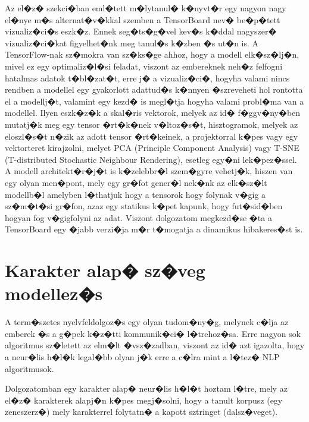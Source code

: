\documentclass[12pt]{report}
\theoremstyle{definition}
\begin{document}
Az el�z� szekci�ban eml�tett m�lytanul� k�nyvt�r egy nagyon nagy el�nye m�s 
alternat�v�kkal szemben a TensorBoard nev� be�p�tett vizualiz�ci�s eszk�z. 
Ennek seg�ts�g�vel kev�s k�ddal nagyszer� vizualiz�ci�kat figyelhet�nk meg 
tanul�s k�zben �s ut�n is. 
A TensorFlow-nak sz�mokra van sz�ks�ge ahhoz, hogy a modell elk�sz�lj�n, mivel 
ez egy optimaliz�l�si feladat, viszont az embereknek neh�z felfogni hatalmas 
adatok t�bl�zat�t, erre j� a vizualiz�ci�, hogyha valami nincs rendben a 
modellel egy gyakorlott adattud�s k�nnyen �szreveheti hol rontotta el a 
modellj�t, valamint egy kezd� is megl�tja hogyha valami probl�ma van a 
modellel. Ilyen eszk�z�k a skal�ris vektorok, melyek az id� f�ggv�ny�ben 
mutatj�k meg egy tensor �rt�k�nek v�ltoz�s�t, hisztogramok, melyek az 
eloszl�s�t n�zik az adott tensor �rt�keinek, a projektorral k�pes vagy egy 
vektorteret kirajzolni, melyet PCA (Principle Component Analysis) vagy T-SNE 
(T-distributed Stochastic Neighbour Rendering), esetleg egy�ni lek�pez�ssel. A 
modell architekt�r�j�t is k�zelebbr�l szem�gyre vehetj�k, hiszen van egy olyan 
men�pont, mely egy gr�fot gener�l nek�nk az elk�sz�lt modellb�l amelyben 
l�thatjuk hogy a tensorok hogy folynak v�gig a sz�m�t�si gr�fon, azaz egy 
statikus k�pet kapunk, hogy fut�sid�ben hogyan fog v�gigfolyni az adat. Viszont 
dolgozatom megkezd�se �ta a TensorBoard egy �jabb verzi�ja m�r t�mogatja a 
dinamikus hibakeres�st is.

\chapter{Karakter alap� sz�veg modellez�s}

A term�szetes nyelvfeldolgoz�s egy olyan tudom�ny�g, melynek c�lja az emberek �s a g�pek k�z�tti kommunik�ci� l�trehoz�sa. Erre nagyon sok algoritmus sz�letett az elm�lt �vsz�zadban, viszont az id� azt igazolta, hogy a neur�lis h�l�k legal�bb olyan j�k erre a c�lra mint a l�tez� NLP algoritmusok. 

Dolgozatomban egy karakter alap� neur�lis h�l�t hoztam l�tre, mely az el�z� karakterek alapj�n k�pes megj�solni, hogy a tanult korpusz (egy zeneszerz�) mely karakterrel folytatn� a kapott sztringet (dalsz�veget).
\end{document}

